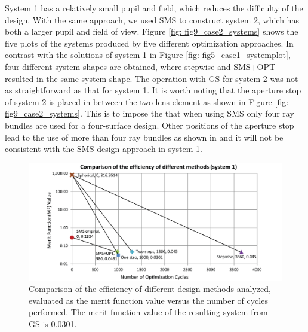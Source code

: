 System 1 has a relatively small pupil and field, which reduces the difficulty of the design. With the same approach, we used SMS to construct system 2, which has both a larger pupil and field of view. Figure \ref{fig: fig9_case2_systems} shows the five plots of the systems produced by five different optimization approaches. In contrast with the solutions of system 1 in Figure \ref{fig: fig5_case1_systemplot}, four different system shapes are obtained, where stepwise and SMS+OPT resulted in the same system shape. The operation with GS for system 2 was not as straightforward as that for system 1. It is worth noting that the aperture stop of system 2 is placed in between the two lens element as shown in Figure \ref{fig: fig9_case2_systems}. This is to impose the that when using SMS only four ray bundles are used for a four-surface design. Other positions of the aperture stop lead to the use of more than four ray bundles as shown in \cite{BenitezSPIE2014}\cite{FDuerrOE2013}\cite{FDuerrOE12} and it will not be consistent with the SMS design approach in system 1.

\begin{figure}[h!]
    \centering
    \includegraphics[width=1\textwidth]{chapter-5/figures/Figure8_OE340147.png}
    \caption{Comparison of the efficiency of different design methods analyzed, evaluated as the merit function value versus the number of cycles performed. The merit function value of the resulting system from GS is 0.0301.}
    \label{fig: fig8_case1_efficiencyCompare}
\end{figure}

